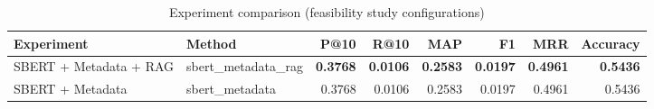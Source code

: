 \begin{table}[htbp]
\centering
\caption{Experiment comparison (feasibility study configurations)}
\label{tab:experiment_comparison}
\begin{tabular}{llrrrrrr}
\toprule
Experiment & Method & P@10 & R@10 & MAP & F1 & MRR & Accuracy \\
\midrule
SBERT + Metadata + RAG & sbert\_metadata\_rag & \textbf{0.3768} & \textbf{0.0106} & \textbf{0.2583} & \textbf{0.0197} & \textbf{0.4961} & \textbf{0.5436} \\
SBERT + Metadata & sbert\_metadata & 0.3768 & 0.0106 & 0.2583 & 0.0197 & 0.4961 & 0.5436 \\
\bottomrule
\end{tabular}
\end{table}
